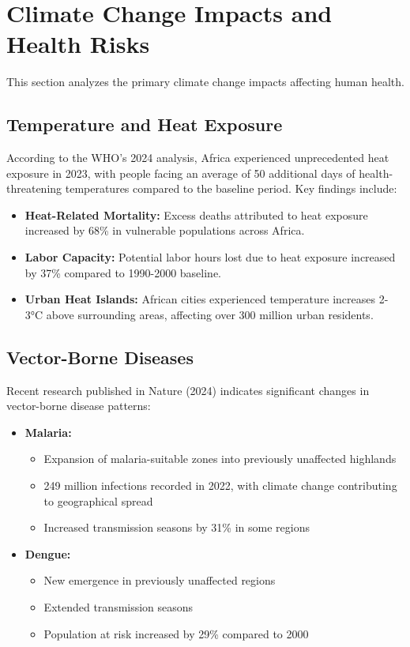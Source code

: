 \section{Climate Change Impacts and Health Risks}
\label{sec:climate_impacts}

This section analyzes the primary climate change impacts affecting human health.

\subsection{Temperature and Heat Exposure}
According to the WHO's 2024 analysis, Africa experienced unprecedented heat exposure in 2023, with people facing an average of 50 additional days of health-threatening temperatures compared to the baseline period. Key findings include:

\begin{itemize}
    \item \textbf{Heat-Related Mortality:} Excess deaths attributed to heat exposure increased by 68\% in vulnerable populations across Africa.
    \item \textbf{Labor Capacity:} Potential labor hours lost due to heat exposure increased by 37\% compared to 1990-2000 baseline.
    \item \textbf{Urban Heat Islands:} African cities experienced temperature increases 2-3°C above surrounding areas, affecting over 300 million urban residents.
\end{itemize}

\subsection{Vector-Borne Diseases}
Recent research published in Nature (2024) indicates significant changes in vector-borne disease patterns:

\begin{itemize}
    \item \textbf{Malaria:} 
    \begin{itemize}
        \item Expansion of malaria-suitable zones into previously unaffected highlands
        \item 249 million infections recorded in 2022, with climate change contributing to geographical spread
        \item Increased transmission seasons by 31\% in some regions
    \end{itemize}
    
    \item \textbf{Dengue:} 
    \begin{itemize}
        \item New emergence in previously unaffected regions
        \item Extended transmission seasons
        \item Population at risk increased by 29\% compared to 2000
    \end{itemize}
\end{itemize}

